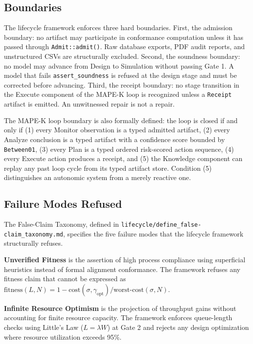 \subsection{Boundaries}
\label{sec:lifecycle-architecture-boundaries}

The lifecycle framework enforces three hard boundaries. First, the admission boundary:
no artifact may participate in conformance computation unless it has passed through
\texttt{Admit::admit()}. Raw database exports, PDF audit reports, and unstructured CSVs
are structurally excluded. Second, the soundness boundary: no model may advance from
Design to Simulation without passing Gate 1. A model that fails \texttt{assert\_soundness}
is refused at the design stage and must be corrected before advancing. Third, the receipt
boundary: no stage transition in the Execute component of the MAPE-K loop is recognized
unless a \texttt{Receipt} artifact is emitted. An unwitnessed repair is not a repair.

The MAPE-K loop boundary is also formally defined: the loop is closed if and only if
(1) every Monitor observation is a typed admitted artifact, (2) every Analyze conclusion
is a typed artifact with a confidence score bounded by \texttt{Between01}, (3) every Plan
is a typed ordered risk-scored action sequence, (4) every Execute action produces a
receipt, and (5) the Knowledge component can replay any past loop cycle from its typed
artifact store. Condition (5) distinguishes an autonomic system from a merely reactive one.

\subsection{Failure Modes Refused}
\label{sec:lifecycle-architecture-failures}

The False-Claim Taxonomy, defined in
\texttt{lifecycle/define\_false-claim\_taxonomy.md}, specifies the five failure modes
that the lifecycle framework structurally refuses.

\textbf{Unverified Fitness} is the assertion of high process compliance using superficial
heuristics instead of formal alignment conformance. The framework refuses any fitness
claim that cannot be expressed as $\mathrm{fitness}(L, N) = 1 -
\mathrm{cost}(\sigma, \gamma_{\mathrm{opt}}) / \mathrm{worst\text{-}cost}(\sigma, N)$.

\textbf{Infinite Resource Optimism} is the projection of throughput gains without
accounting for finite resource capacity. The framework enforces queue-length checks
using Little's Law ($L = \lambda W$) at Gate 2 and rejects any design optimization
where resource utilization exceeds 95\%.

